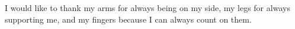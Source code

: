 I would like to thank my arms for always being on my side, my legs for always supporting me, and my fingers because I can always count on them.